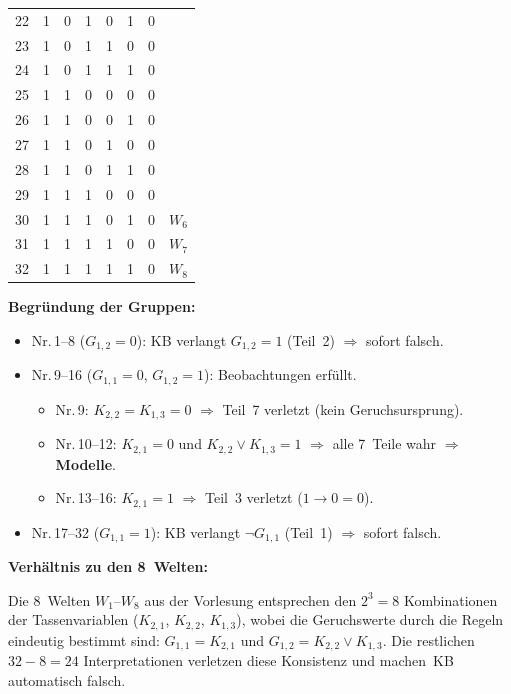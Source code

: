 \documentclass[a4paper,12pt]{article}
\begin{document}
\begin{center}
\begin{tabular}{r|ccccc|c|c}
22 & 1 & 0 & 1 & 0 & 1 & 0 & \\
23 & 1 & 0 & 1 & 1 & 0 & 0 & \\
24 & 1 & 0 & 1 & 1 & 1 & 0 & \\
\midrule
25 & 1 & 1 & 0 & 0 & 0 & 0 & \\
26 & 1 & 1 & 0 & 0 & 1 & 0 & \\
27 & 1 & 1 & 0 & 1 & 0 & 0 & \\
28 & 1 & 1 & 0 & 1 & 1 & 0 & \\
29 & 1 & 1 & 1 & 0 & 0 & 0 & \\
30 & 1 & 1 & 1 & 0 & 1 & 0 & $W_6$ \\
31 & 1 & 1 & 1 & 1 & 0 & 0 & $W_7$ \\
32 & 1 & 1 & 1 & 1 & 1 & 0 & $W_8$ \\
\bottomrule
\end{tabular}
\end{center}

\medskip
\textbf{Begr\"undung der Gruppen:}
\begin{itemize}[nosep]
\item Nr.\,1--8 ($G_{1,2}=0$): KB verlangt $G_{1,2}=1$ (Teil~2)
      $\Rightarrow$ sofort falsch.
\item Nr.\,9--16 ($G_{1,1}=0$, $G_{1,2}=1$): Beobachtungen erf\"ullt.
      \begin{itemize}[nosep]
      \item Nr.\,9: $K_{2,2}=K_{1,3}=0$ $\Rightarrow$ Teil~7 verletzt (kein Geruchsursprung).
      \item Nr.\,10--12: $K_{2,1}=0$ und $K_{2,2} \vee K_{1,3} = 1$
            $\Rightarrow$ alle 7~Teile wahr $\Rightarrow$ \textbf{Modelle}.
      \item Nr.\,13--16: $K_{2,1}=1$ $\Rightarrow$ Teil~3 verletzt ($1 \to 0 = 0$).
      \end{itemize}
\item Nr.\,17--32 ($G_{1,1}=1$): KB verlangt $\neg G_{1,1}$ (Teil~1)
      $\Rightarrow$ sofort falsch.
\end{itemize}

\bigskip
\textbf{Verh\"altnis zu den 8~Welten:}

Die 8~Welten $W_1$--$W_8$ aus der Vorlesung entsprechen den $2^3 = 8$
Kombinationen der Tassenvariablen ($K_{2,1}$, $K_{2,2}$, $K_{1,3}$),
wobei die Geruchswerte durch die Regeln eindeutig bestimmt sind:
$G_{1,1} = K_{2,1}$ und $G_{1,2} = K_{2,2} \vee K_{1,3}$.
Die restlichen $32-8 = 24$ Interpretationen verletzen diese
Konsistenz und machen~KB automatisch falsch.
\end{document}
